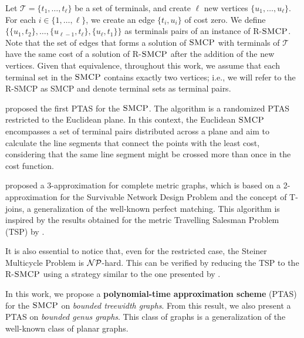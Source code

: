 Let \(\mathcal{T} = \{t_1, \dots, t_\ell\}\) be a set of terminals, and create \(\ell\) new vertices \(\{u_1, \dots, u_\ell\}\). For each \(i \in \{1, \ldots, \ell\}\), we create an edge \(\{t_i, u_i\}\) of cost zero. We define \(\{\{u_1, t_2\}, \dots, \{u_{\ell-1}, t_\ell\}, \{u_\ell, t_1\}\}\) as terminals pairs of an instance of R-\(\textsc{SMCP}\). Note that the set of edges that forms a solution of \(\textsc{SMCP}\) with terminals of \(\mathcal{T}\) have the same cost of a solution of R-\(\textsc{SMCP}\) after the addition of the new vertices. Given that equivalence, throughout this work, we assume that each terminal set in the \(\textsc{SMCP}\) contains exactly two vertices; i.e., we will refer to the R-SMCP as SMCP and denote terminal sets as terminal pairs.

\cite{LINTZMAYER2020134} proposed the first PTAS for the \(\textsc{SMCP}\). The algorithm is a randomized PTAS restricted to the Euclidean plane. In this context, the Euclidean \(\textsc{SMCP}\) encompasses a set of terminal pairs distributed across a plane and aim to calculate the line segments that connect the points with the least cost, considering that the same line segment might be crossed more than once in the cost function.

\cite{smcp_3apx} proposed a 3-approximation for complete metric graphs, which is based on a 2-approximation for the Survivable Network Design Problem and the concept of T-joins, a generalization of the well-known perfect matching. This algorithm is inspired by the results obtained for the metric Travelling Salesman Problem (TSP) by \cite{Christofides2022WorstCaseAO}.

It is also essential to notice that, even for the restricted case, the Steiner Multicycle Problem is \(\mathcal{NP}\)-hard. This can be verified by reducing the TSP to the R-\(\textsc{SMCP}\) using a strategy similar to the one presented by \citeauthor{LINTZMAYER2020134}.

In this work, we propose a \textbf{polynomial-time approximation scheme} (PTAS) for the \(\textsc{SMCP}\) on \textit{bounded treewidth graphs}. From this result, we also present a PTAS on \textit{bounded genus graphs}. This class of graphs is a generalization of the well-known class of planar graphs.

